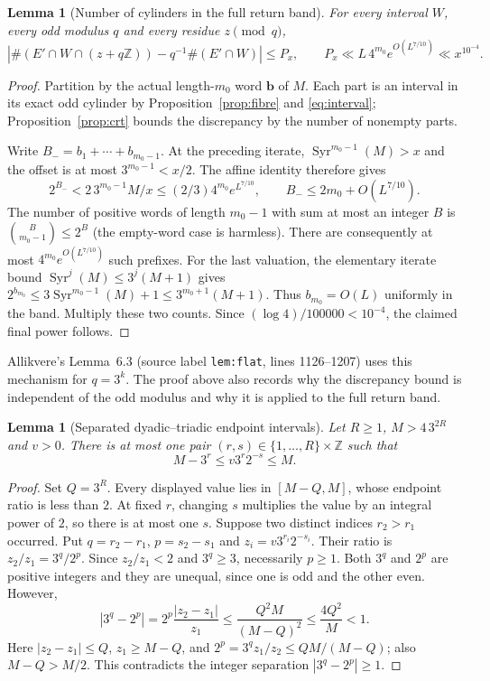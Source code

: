 \documentclass[11pt]{article}
\newtheorem{lemma}[proposition]{Lemma}
\theoremstyle{remark}\newtheorem{remark}[proposition]{Remark}
\newcommand{\ZZ}{\mathbb Z}
\newcommand{\Syr}{\operatorname{Syr}}
\begin{document}
\begin{lemma}[Number of cylinders in the full return band]\label{lem:flat-band}
For every interval $W$, every odd modulus $q$ and every residue $z\pmod q$,
\[
 \left|\#(E'\cap W\cap(z+q\ZZ))-q^{-1}\#(E'\cap W)\right|
 \le P_x,\qquad
 P_x\ll L\,4^{m_0}e^{O(L^{7/10})}\ll x^{10^{-4}}.
\]
\end{lemma}
\begin{proof}
Partition by the actual length-$m_0$ word $\mathbf b$ of $M$. Each part
is an interval in its exact odd cylinder by Proposition~\ref{prop:fibre}
and \eqref{eq:interval}; Proposition~\ref{prop:crt} bounds the discrepancy
by the number of nonempty parts.

Write $B_-=b_1+\cdots+b_{m_0-1}$. At the preceding iterate,
$\Syr^{m_0-1}(M)>x$ and the offset is at most $3^{m_0-1}<x/2$.
The affine identity therefore gives
\[
 2^{B_-}<2\,3^{m_0-1}M/x
 \le(2/3)4^{m_0}e^{L^{7/10}},
 \qquad B_-\le2m_0+O(L^{7/10}).
\]
The number of positive words of length $m_0-1$ with sum at most an
integer $B$ is $\binom{B}{m_0-1}\le2^B$ (the empty-word case is harmless).
There are consequently at most $4^{m_0}e^{O(L^{7/10})}$ such prefixes.
For the last valuation, the elementary iterate bound
$\Syr^j(M)\le3^j(M+1)$ gives
$2^{b_{m_0}}\le3\Syr^{m_0-1}(M)+1\le 3^{m_0+1}(M+1)$.
Thus $b_{m_0}=O(L)$ uniformly in the band. Multiply these two counts.
Since $(\log4)/100000<10^{-4}$, the claimed final power follows.
\end{proof}

Allikvere's Lemma~6.3 (source label \texttt{lem:flat}, lines 1126--1207)
uses this mechanism for $q=3^k$. The proof above also records why the
discrepancy bound is independent of the odd modulus and why it is applied
to the full return band.

\begin{lemma}[Separated dyadic--triadic endpoint intervals]
\label{lem:one-endpoint}
Let $R\ge1$, $M>4\,3^{2R}$ and $v>0$. There is at most one pair
$(r,s)\in\{1,\ldots,R\}\times\ZZ$ such that
\begin{equation}\label{eq:endpoint-incidence}
 M-3^r\le v3^r2^{-s}\le M.
\end{equation}
\end{lemma}
\begin{proof}
Set $Q=3^R$. Every displayed value lies in $[M-Q,M]$, whose endpoint
ratio is less than $2$. At fixed $r$, changing $s$ multiplies the value
by an integral power of $2$, so there is at most one $s$.
Suppose two distinct indices $r_2>r_1$ occurred. Put
$q=r_2-r_1$, $p=s_2-s_1$ and $z_i=v3^{r_i}2^{-s_i}$.
Their ratio is $z_2/z_1=3^q/2^p$. Since
$z_2/z_1<2$ and $3^q\ge3$, necessarily $p\ge1$.
Both $3^q$ and $2^p$ are positive integers and they are unequal, since
one is odd and the other even. However,
\[
 |3^q-2^p|=2^p\frac{|z_2-z_1|}{z_1}
 \le\frac{Q^2M}{(M-Q)^2}
 \le\frac{4Q^2}{M}<1.
\]
Here $|z_2-z_1|\le Q$, $z_1\ge M-Q$, and
$2^p=3^qz_1/z_2\le QM/(M-Q)$; also $M-Q>M/2$.
This contradicts the integer separation $|3^q-2^p|\ge1$.
\end{proof}
\end{document}
